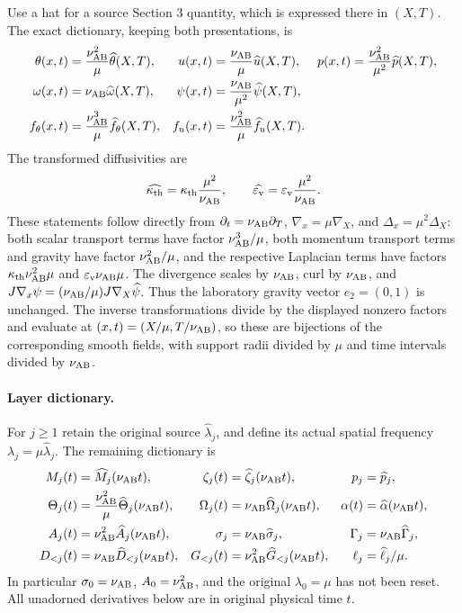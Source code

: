 Use a hat for a source Section 3 quantity, which is expressed there in $(X,T)$. The exact dictionary, keeping both presentations, is
\begin{align}
 \theta(x,t)&=\frac{\nu_{\mathrm{AB}}^2}{\mu}\widehat\theta(X,T),&
 u(x,t)&=\frac{\nu_{\mathrm{AB}}}\mu\widehat u(X,T),&
 p(x,t)&=\frac{\nu_{\mathrm{AB}}^2}{\mu^2}\widehat p(X,T),\label{cvlane:pc:eq:scaling}\\
 \omega(x,t)&=\nu_{\mathrm{AB}}\widehat\omega(X,T),&
 \psi(x,t)&=\frac{\nu_{\mathrm{AB}}}{\mu^2}\widehat\psi(X,T),\nonumber\\
 f_\theta(x,t)&=\frac{\nu_{\mathrm{AB}}^3}{\mu}\widehat f_\theta(X,T),&
 f_u(x,t)&=\frac{\nu_{\mathrm{AB}}^2}{\mu}\widehat f_u(X,T).\nonumber
\end{align}
The transformed diffusivities are
\begin{equation}\label{cvlane:pc:eq:scaled-diffusion}
 \widehat{\kappa_{\mathrm{th}}}=\kappa_{\mathrm{th}}\frac{\mu^2}{\nu_{\mathrm{AB}}},\qquad
 \widehat{\varepsilon_{\mathrm v}}=\varepsilon_{\mathrm v}\frac{\mu^2}{\nu_{\mathrm{AB}}}.
\end{equation}
These statements follow directly from $\partial_t=\nu_{\mathrm{AB}}\partial_T$, $\nabla_x=\mu\nabla_X$, and $\Delta_x=\mu^2\Delta_X$: both scalar transport terms have factor $\nu_{\mathrm{AB}}^3/\mu$, both momentum transport terms and gravity have factor $\nu_{\mathrm{AB}}^2/\mu$, and the respective Laplacian terms have factors $\kappa_{\mathrm{th}}\nu_{\mathrm{AB}}^2\mu$ and $\varepsilon_{\mathrm v}\nu_{\mathrm{AB}}\mu$. The divergence scales by $\nu_{\mathrm{AB}}$, curl by $\nu_{\mathrm{AB}}$, and $J\nabla_x\psi=(\nu_{\mathrm{AB}}/\mu)J\nabla_X\widehat\psi$. Thus the laboratory gravity vector $e_2=(0,1)$ is unchanged. The inverse transformations divide by the displayed nonzero factors and evaluate at $(x,t)=(X/\mu,T/\nu_{\mathrm{AB}})$, so these are bijections of the corresponding smooth fields, with support radii divided by $\mu$ and time intervals divided by $\nu_{\mathrm{AB}}$.

\paragraph{Layer dictionary.}
For $j\ge1$ retain the original source $\widehat\lambda_j$, and define its actual spatial frequency $\lambda_j=\mu\widehat\lambda_j$. The remaining dictionary is
\begin{align}
 M_j(t)&=\widehat M_j(\nu_{\mathrm{AB}}t),&\zeta_j(t)&=\widehat\zeta_j(\nu_{\mathrm{AB}}t),&p_j&=\widehat p_j,\\
 \Theta_j(t)&=\frac{\nu_{\mathrm{AB}}^2}{\mu}\widehat\Theta_j(\nu_{\mathrm{AB}}t),&
 \Omega_j(t)&=\nu_{\mathrm{AB}}\widehat\Omega_j(\nu_{\mathrm{AB}}t),&
 \alpha(t)&=\widehat\alpha(\nu_{\mathrm{AB}}t),\nonumber\\
 A_j(t)&=\nu_{\mathrm{AB}}^2\widehat A_j(\nu_{\mathrm{AB}}t),&
 \sigma_j&=\nu_{\mathrm{AB}}\widehat\sigma_j,&
 \Gamma_j&=\nu_{\mathrm{AB}}\widehat\Gamma_j,\nonumber\\
 D_{<j}(t)&=\nu_{\mathrm{AB}}\widehat D_{<j}(\nu_{\mathrm{AB}}t),&
 G_{<j}(t)&=\nu_{\mathrm{AB}}^2\widehat G_{<j}(\nu_{\mathrm{AB}}t),&
 \ell_j&=\widehat\ell_j/\mu.\nonumber
\end{align}
In particular $\sigma_0=\nu_{\mathrm{AB}}$, $A_0=\nu_{\mathrm{AB}}^2$, and the original $\lambda_0=\mu$ has not been reset. All unadorned derivatives below are in original physical time $t$.

